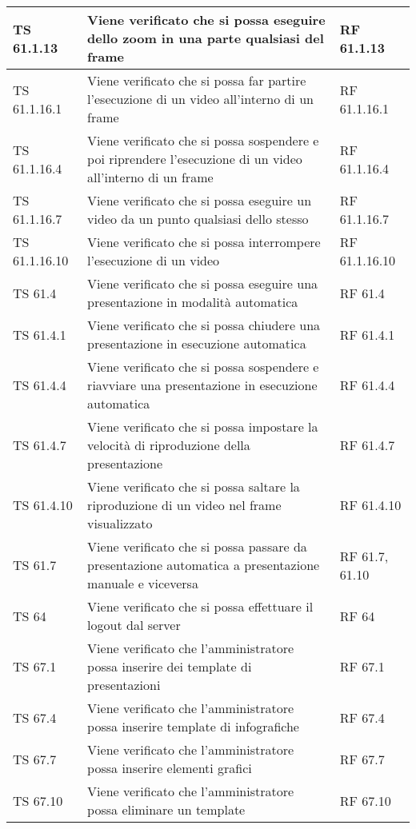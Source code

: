 {{\begin{longtable} [c]{| p{3cm} | p{6cm} |p{3cm}|}
			\hline
			TS 61.1.13 & Viene verificato che si possa eseguire dello zoom in una parte qualsiasi del frame & RF 61.1.13\\
			\hline
			TS 61.1.16.1 & Viene verificato che si possa far partire l'esecuzione di un video all'interno di un frame & RF 61.1.16.1\\
			\hline
			TS 61.1.16.4 & Viene verificato che si possa sospendere e poi riprendere l'esecuzione di un video all'interno di un frame & RF 61.1.16.4\\
			\hline
			TS 61.1.16.7 & Viene verificato che si possa eseguire un video da un punto qualsiasi dello stesso & RF 61.1.16.7\\
			\hline
			TS 61.1.16.10 & Viene verificato che si possa interrompere l'esecuzione di un video & RF 61.1.16.10\\
			\hline
			TS 61.4 & Viene verificato che si possa eseguire una presentazione in modalità automatica & RF 61.4\\
			\hline
			TS 61.4.1 & Viene verificato che si possa chiudere una presentazione in esecuzione automatica & RF 61.4.1\\
			\hline
			TS 61.4.4 & Viene verificato che si possa sospendere e riavviare una presentazione in esecuzione automatica & RF 61.4.4\\
			\hline
			TS 61.4.7 & Viene verificato che si possa impostare la velocità di riproduzione della presentazione & RF 61.4.7\\
			\hline
			TS 61.4.10 & Viene verificato che si possa saltare la riproduzione di un video nel frame visualizzato & RF 61.4.10\\
			\hline
			TS 61.7 & Viene verificato che si possa passare da presentazione automatica a presentazione manuale e viceversa & RF 61.7, 61.10\\
			\hline
			TS 64 & Viene verificato che si possa effettuare il logout dal server & RF 64\\
			\hline
			TS 67.1 & Viene verificato che l'amministratore possa inserire dei template di presentazioni & RF 67.1\\
			\hline
			TS 67.4 & Viene verificato che l'amministratore possa inserire template di infografiche & RF 67.4\\
			\hline
			TS 67.7 & Viene verificato che l'amministratore possa inserire elementi grafici & RF 67.7\\
			\hline
			TS 67.10 & Viene verificato che l'amministratore possa eliminare un template & RF 67.10\\
			\hline

\end{longtable}}}
